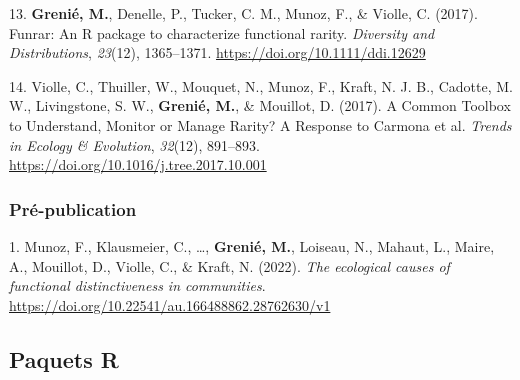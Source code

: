 \documentclass[10pt,a4paper,]{article}
\begin{document}
\leavevmode{}%
13. \textbf{Grenié, M.}, Denelle, P., Tucker, C. M., Munoz, F., \&
Violle, C. (2017). Funrar: An R package to characterize functional
rarity. \emph{Diversity and Distributions}, \emph{23}(12), 1365--1371.
\url{https://doi.org/10.1111/ddi.12629}

\leavevmode{}%
14. Violle, C., Thuiller, W., Mouquet, N., Munoz, F., Kraft, N. J. B.,
Cadotte, M. W., Livingstone, S. W., \textbf{Grenié, M.}, \& Mouillot, D.
(2017). A Common Toolbox to Understand, Monitor or Manage Rarity? A
Response to Carmona et al. \emph{Trends in Ecology \& Evolution},
\emph{32}(12), 891--893.
\url{https://doi.org/10.1016/j.tree.2017.10.001}

\hypertarget{pruxe9-publication}{%
\subsubsection{Pré-publication}\label{pruxe9-publication}}

\hypertarget{bibliography}{}
\leavevmode{}%
1. Munoz, F., Klausmeier, C., \ldots, \textbf{Grenié, M.}, Loiseau, N.,
Mahaut, L., Maire, A., Mouillot, D., Violle, C., \& Kraft, N. (2022).
\emph{The ecological causes of functional distinctiveness in
communities}. \url{https://doi.org/10.22541/au.166488862.28762630/v1}

\hypertarget{paquets-r}{%
\subsection{Paquets R}\label{paquets-r}}
\end{document}
